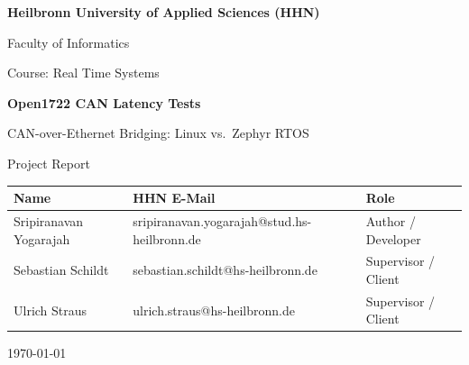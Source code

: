 \documentclass[11pt,a4paper]{article}
\begin{document}
\begin{titlepage}
    \centering
    \vspace*{1.5cm}

    \vspace{1cm}

    {\Large \textbf{Heilbronn University of Applied Sciences (HHN)} \par}
    {\large Faculty of Informatics \par}
    {\large Course: Real Time Systems \par}

    \vspace{2cm}

    {\huge \bfseries Open1722 CAN Latency Tests \par}
    \vspace{0.4cm}
    {\LARGE CAN-over-Ethernet Bridging: Linux vs.\ Zephyr RTOS \par}
    \vspace{0.3cm}
    {\Large Project Report \par}

    \vfill

    \begin{tabular}{@{}lll@{}}
        \toprule
        \textbf{Name} & \textbf{HHN E-Mail} & \textbf{Role} \\
        \midrule
        Sripiranavan Yogarajah
            & sripiranavan.yogarajah@stud.hs-heilbronn.de
            & Author / Developer \\
        \midrule
        Sebastian Schildt
            & sebastian.schildt@hs-heilbronn.de
            & Supervisor / Client \\
        Ulrich Straus
            & ulrich.straus@hs-heilbronn.de
            & Supervisor / Client \\
        \bottomrule
    \end{tabular}

    \vfill

    {\large \today \par}
\end{titlepage}

\newpage
{}
\tableofcontents
\clearpage
{}

\end{document}
